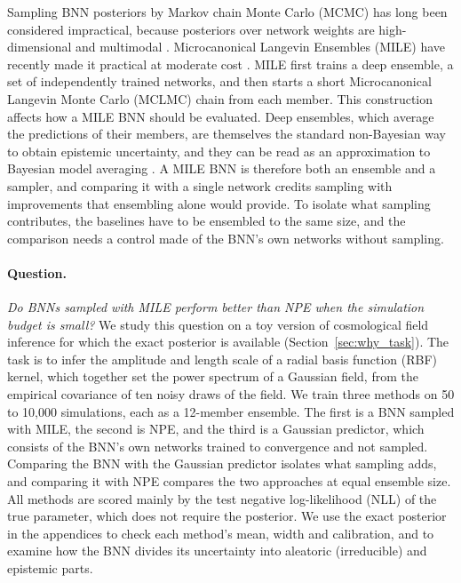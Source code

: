 \documentclass[11pt]{article}
\begin{document}
Sampling BNN posteriors by Markov chain Monte Carlo (MCMC) has long been considered impractical, because posteriors
over network weights are high-dimensional and multimodal \citep{papamarkou2022challenges,izmailov2021bnn}.
Microcanonical Langevin Ensembles (MILE) have recently made it practical at moderate cost \citep{sommer2025mile}. MILE
first trains a deep ensemble, a set of independently trained networks, and then starts a short Microcanonical Langevin
Monte Carlo (MCLMC) chain \citep{robnik2024mclmc} from each member. This construction affects how a MILE BNN should be
evaluated. Deep ensembles, which average the predictions of their members, are themselves the standard non-Bayesian
way to obtain epistemic uncertainty, and they can be read as an approximation to Bayesian model averaging
\citep{lakshminarayanan2017ensembles,wilson2020bayesian}. A MILE BNN is therefore both an ensemble and a sampler, and
comparing it with a single network credits sampling with improvements that ensembling alone would provide. To isolate
what sampling contributes, the baselines have to be ensembled to the same size, and the comparison needs a control made
of the BNN's own networks without sampling.

\paragraph{Question.} \emph{Do BNNs sampled with MILE perform better than NPE when the simulation budget is small?}
We study this question on a toy version of cosmological field inference for which the exact posterior is available
(Section~\ref{sec:why_task}). The task is to infer the amplitude and length scale of a radial basis function (RBF)
kernel, which together set the power spectrum of a Gaussian field, from the empirical covariance of ten noisy draws of
the field. We train three methods on 50 to 10{,}000 simulations, each as a 12-member ensemble. The first is a BNN
sampled with MILE, the second is NPE, and the third is a Gaussian predictor, which consists of the BNN's own networks
trained to convergence and not sampled. Comparing the BNN with the Gaussian predictor isolates what sampling adds, and
comparing it with NPE compares the two approaches at equal ensemble size. All methods are scored mainly by the test
negative log-likelihood (NLL) of the true parameter, which does not require the posterior. We use the exact posterior
in the appendices to check each method's mean, width and calibration, and to examine how the BNN divides its
uncertainty into aleatoric (irreducible) and epistemic parts.
\end{document}
